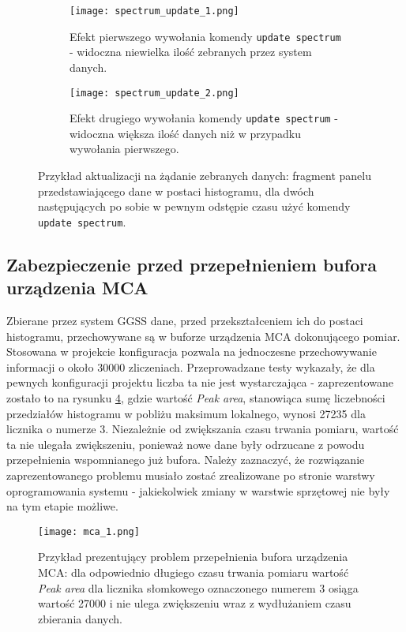 \begin{figure}[H]
\centering

\begin{subfigure}{0.66\textwidth}
\centering
\texttt{[image: spectrum\_update\_1.png]}
\caption{Efekt pierwszego wywołania komendy \lstinline{update spectrum} - widoczna niewielka ilość zebranych przez system danych.}
\label{fig:spectrum_update_1}
\end{subfigure}

\vspace*{8pt}%

\begin{subfigure}{0.66\textwidth}
\centering
\texttt{[image: spectrum\_update\_2.png]}
\caption{Efekt drugiego wywołania komendy \lstinline{update spectrum} - widoczna większa ilość danych niż w przypadku wywołania pierwszego.}
\label{fig:spectrum_update_2}
\end{subfigure}

\caption{Przykład aktualizacji na żądanie zebranych danych: fragment panelu przedstawiającego dane w postaci histogramu, dla dwóch następujących po sobie w pewnym odstępie czasu użyć komendy \lstinline{update spectrum}.}
\label{fig:spectrum_update}
\end{figure}

\clearpage
\subsection{Zabezpieczenie przed przepełnieniem bufora urządzenia MCA}
Zbierane przez system GGSS dane, przed przekształceniem ich do postaci histogramu, przechowywane są w buforze urządzenia MCA dokonującego pomiar. Stosowana w projekcie konfiguracja pozwala na jednoczesne przechowywanie informacji o około 30000 zliczeniach. Przeprowadzane testy wykazały, że dla pewnych konfiguracji projektu liczba ta nie jest wystarczająca - zaprezentowane zostało to na rysunku \ref{fig:mca_1}, gdzie wartość \emph{Peak area}, stanowiąca sumę liczebności przedziałów histogramu w pobliżu maksimum lokalnego, wynosi 27235 dla licznika o numerze 3. Niezależnie od zwiększania czasu trwania pomiaru, wartość ta nie ulegała zwiększeniu, ponieważ nowe dane były odrzucane z powodu przepełnienia wspomnianego już bufora. Należy zaznaczyć, że rozwiązanie zaprezentowanego problemu musiało zostać zrealizowane po stronie warstwy oprogramowania systemu - jakiekolwiek zmiany w warstwie sprzętowej nie były na tym etapie możliwe.

\begin{figure}[H]
\centering
\texttt{[image: mca\_1.png]}
\caption{Przykład prezentujący problem przepełnienia bufora urządzenia MCA: dla odpowiednio długiego czasu trwania pomiaru wartość \emph{Peak area} dla licznika słomkowego oznaczonego numerem 3 osiąga wartość 27000 i nie ulega zwiększeniu wraz z wydłużaniem czasu zbierania danych.}
\label{fig:mca_1}
\end{figure}

